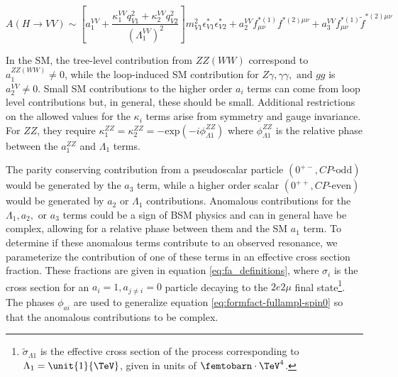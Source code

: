 \begin{equation}
A(H\to VV) \sim
\left[ a_{1}^{VV}
+ \frac{\kappa_1^{VV}q_{V1}^2 + \kappa_2^{VV} q_{V2}^{2}}{\left(\Lambda_{1}^{VV} \right)^{2}} \right]
m_{V1}^2 \epsilon_{V1}^* \epsilon_{V2}^*
+ a_{2}^{VV}  f_{\mu \nu}^{*(1)}f^{*(2)\mu\nu}
+ a_{3}^{VV}   f^{*(1)}_{\mu \nu} {\tilde f}^{*(2)\mu\nu}
\label{eq:formfact-fullampl-spin0}
\end{equation}

In the SM, the tree-level contribution from $ZZ \left(WW\right)$ correspond to $a_{1}^{ZZ \left(WW\right)} \neq 0$, while the loop-induced SM contribution for $Z\gamma, \gamma\gamma, \text{ and } gg$ is $a_{2}^{VV} \neq 0$. Small SM contributions to the higher order $a_{i}$ terms can come from loop level contributions but, in general, these should be small. Additional restrictions on the allowed values for the $\kappa_{i}$ terms arise from symmetry and gauge invariance. For $ZZ$, they require $\kappa_{1}^{ZZ} = \kappa_{2}^{ZZ} = - \text{exp}\left(-i\phi_{\Lambda1}^{ZZ}\right)$ where $\phi_{\Lambda1}^{ZZ}$ is the relative phase between the $a_{1}^{ZZ}$ and $\Lambda_{1}$ terms. 

The parity conserving contribution from a pseudoscalar particle $\left( 0^{+-}, CP\text{-odd} \right)$ would be generated by the $a_{3}$ term, while a higher order scalar $\left( 0^{++}, CP\text{-even} \right)$ would be generated by $a_{2}$ or $\Lambda_{1}$ contributions. Anomalous contributions for the $\Lambda_{1}, a_{2}, \text{ or } a_{3}$ terms could be a sign of BSM physics and can in general have be complex, allowing for a relative phase between them and the SM $a_{1}$ term. To determine if these anomalous terms contribute to an observed resonance, we parameterize the contribution of one of these terms in an effective cross section fraction. These fractions are given in equation \eqref{eq:fa_definitions}, where $\sigma_{i}$ is the cross section for an $a_{i} = 1, a_{j\neq i} = 0$ particle decaying to the $2e2\mu$ final state\footnote{$\tilde{\sigma}_{\Lambda{1}}$ is the effective cross section of the process corresponding to $\Lambda_{1} = \unit{1}{\TeV}$, given in units of $\femtobarn\cdot\TeV^{4}$.}. The phases $\phi_{ai}$ are used to generalize equation \eqref{eq:formfact-fullampl-spin0} so that the anomalous contributions to be complex.

